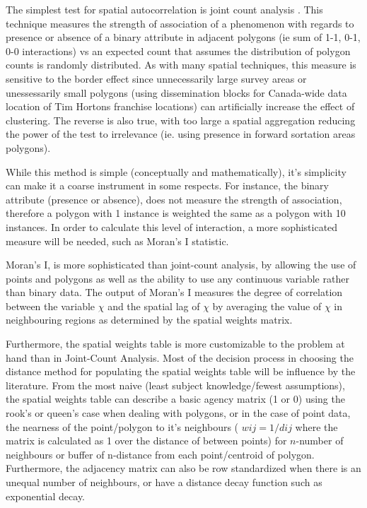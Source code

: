 \documentclass[12pt,letterpaper,notitlepage,onecolumn,final,openbib]{article}
\begin{document}
The simplest test for spatial autocorrelation is joint count analysis \cite{LeeWong2001}. This technique measures the strength of association of a phenomenon with regards to presence or absence of a binary attribute in adjacent polygons (ie sum of 1-1, 0-1, 0-0 interactions) vs an expected count that assumes the distribution of polygon counts is randomly distributed. As with many spatial techniques, this measure is sensitive to the border effect since unnecessarily large survey areas or unessessarily small polygons (using dissemination blocks for Canada-wide data location of Tim Hortons franchise locations) can artificially increase the effect of clustering.  The reverse is also true, with too large a spatial aggregation reducing the power of the test to irrelevance (ie. using presence in forward sortation areas polygons).   

While this method is simple (conceptually and mathematically), it's simplicity can make it a coarse instrument in some respects.  For instance, the binary attribute (presence or absence), does not measure the strength of association, therefore a polygon with 1 instance is weighted the same as a polygon with 10 instances.  In order to calculate this level of interaction, a more sophisticated measure will be needed, such as Moran's I statistic.  

Moran's I, is more sophisticated than joint-count analysis, by allowing the use of points and  polygons as well as the ability to use any continuous variable rather than binary data.  The output of Moran's I measures the degree of correlation between the variable $\chi$ and the spatial lag of $\chi$ by averaging the value of $\chi$ in neighbouring regions as determined by the spatial weights matrix. 

Furthermore, the spatial weights table is more customizable to the problem at hand than in Joint-Count Analysis.  Most of the decision process in choosing the distance method for populating the spatial weights table will be influence by the literature.  From the most naive (least subject knowledge/fewest assumptions), the spatial weights table can describe a basic agency matrix (1 or 0) using the rook's or queen's case when dealing with polygons, or in the case of point data, the nearness of the point/polygon to it's neighbours ( $wij = 1/dij$ where the matrix is calculated as 1 over the distance of between points) for $n$-number of neighbours or buffer of n-distance from each point/centroid of polygon.  Furthermore, the adjacency matrix can also be row standardized when there is an unequal number of neighbours, or have a distance decay function such as exponential decay.   
\end{document}
